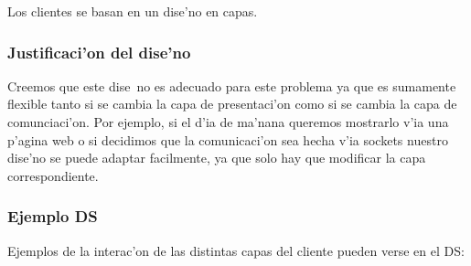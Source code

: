 Los clientes se basan en un dise'no en capas.

\subsubsection{Justificaci'on del dise'no}
Creemos que este dise~no es adecuado para este problema ya que es sumamente flexible tanto si se cambia la capa de presentaci'on como si se cambia la capa de comunciaci'on. Por ejemplo, si el d'ia de ma'nana queremos mostrarlo v'ia una p'agina web o si decidimos que la comunicaci'on sea hecha v'ia sockets nuestro dise'no se puede adaptar facilmente, ya que solo hay que modificar la capa correspondiente.

\subsubsection{Ejemplo DS}
Ejemplos de la interac'on de las distintas capas del cliente pueden verse en el DS:

